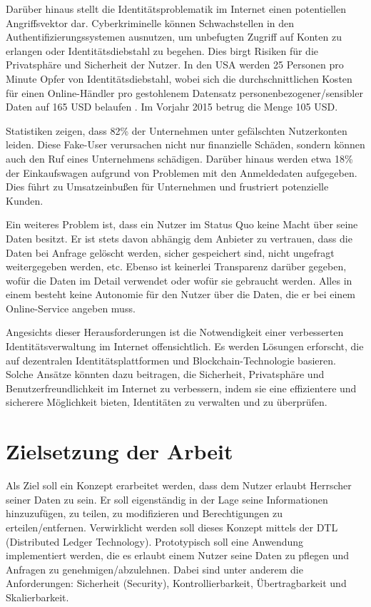 Darüber hinaus stellt die Identitätsproblematik im Internet einen potentiellen Angriffsvektor dar. Cyberkriminelle können Schwachstellen in den Authentifizierungssystemen ausnutzen, um unbefugten Zugriff auf Konten zu erlangen oder Identitätsdiebstahl zu begehen. Dies birgt Risiken für die Privatsphäre und Sicherheit der Nutzer. In den USA werden 25 Personen pro Minute Opfer von Identitätsdiebstahl, wobei sich die durchschnittlichen Kosten für einen Online-Händler pro gestohlenem Datensatz personenbezogener/sensibler Daten auf 165 USD belaufen \cite{ID10}. Im Vorjahr 2015 betrug die Menge 105 USD.

Statistiken \cite{ID11} zeigen, dass 82\% der Unternehmen unter gefälschten Nutzerkonten leiden. Diese Fake-User verursachen nicht nur finanzielle Schäden, sondern können auch den Ruf eines Unternehmens schädigen. Darüber hinaus werden etwa 18\% der Einkaufswagen aufgrund von Problemen mit den Anmeldedaten aufgegeben. Dies führt zu Umsatzeinbußen für Unternehmen und frustriert potenzielle Kunden.

Ein weiteres Problem ist, dass ein Nutzer im Status Quo keine Macht über seine Daten besitzt. Er ist stets davon abhängig dem Anbieter zu vertrauen, dass die Daten bei Anfrage gelöscht werden, sicher gespeichert sind, nicht ungefragt weitergegeben werden, etc. Ebenso ist keinerlei Transparenz darüber gegeben, wofür die Daten im Detail verwendet oder wofür sie gebraucht werden. Alles in einem besteht keine Autonomie für den Nutzer über die Daten, die er bei einem Online-Service angeben muss.

Angesichts dieser Herausforderungen ist die Notwendigkeit einer verbesserten Identitätsverwaltung im Internet offensichtlich. Es werden Lösungen erforscht, die auf dezentralen Identitätsplattformen und Blockchain-Technologie basieren. Solche Ansätze könnten dazu beitragen, die Sicherheit, Privatsphäre und Benutzerfreundlichkeit im Internet zu verbessern, indem sie eine effizientere und sicherere Möglichkeit bieten, Identitäten zu verwalten und zu überprüfen.

\section{Zielsetzung der Arbeit}
Als Ziel soll ein Konzept erarbeitet werden, dass dem Nutzer erlaubt Herrscher seiner
Daten zu sein. Er soll eigenständig in der Lage seine Informationen hinzuzufügen, zu
teilen, zu modifizieren und Berechtigungen zu erteilen/entfernen. Verwirklicht werden
soll dieses Konzept mittels der DTL (Distributed Ledger Technology). Prototypisch
soll eine Anwendung implementiert werden, die es erlaubt einem Nutzer seine Daten
zu pflegen und Anfragen zu genehmigen/abzulehnen. Dabei sind unter anderem die
Anforderungen: Sicherheit (Security), Kontrollierbarkeit, Übertragbarkeit und Skalierbarkeit.

